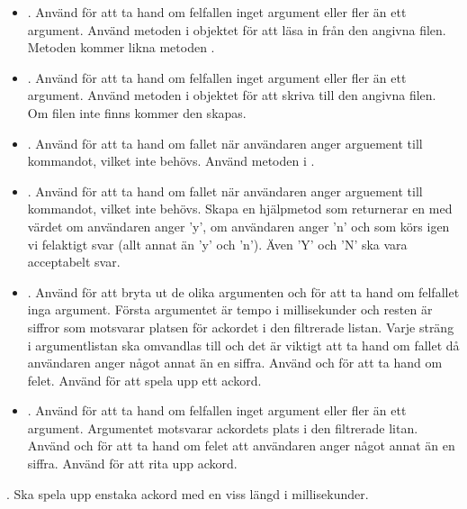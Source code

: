 {\begin{itemize}
\item {}. Använd  för att ta hand om felfallen inget argument eller fler än ett argument. Använd metoden  i objektet  för att läsa in från den angivna filen. Metoden kommer likna metoden .

\item {}. Använd  för att ta hand om felfallen inget argument eller fler än ett argument. Använd metoden  i objektet  för att skriva till den angivna filen. Om filen inte finns kommer den skapas.

\item {}. Använd  för att ta hand om fallet när användaren anger arguement till kommandot, vilket inte behövs. Använd metoden i .

\item {}. Använd  för att ta hand om fallet när användaren anger arguement till kommandot, vilket inte behövs. Skapa en hjälpmetod  som returnerar en  med värdet  om användaren anger 'y',  om användaren anger 'n' och som körs igen vi felaktigt svar (allt annat än 'y' och 'n'). Även 'Y' och 'N' ska vara acceptabelt svar.

\item {}. Använd  för att bryta ut de olika argumenten och för att ta hand om felfallet inga argument. Första argumentet är tempo i millisekunder och resten är siffror som motsvarar platsen för ackordet i den filtrerade listan. Varje sträng i argumentlistan ska omvandlas till  och det är viktigt att ta hand om fallet då användaren anger något annat än en siffra. Använd  och  för att ta hand om felet. Använd  för att spela upp ett ackord.

\item {}. Använd  för att ta hand om felfallen inget argument eller fler än ett argument. Argumentet motsvarar ackordets plats i den filtrerade litan. Använd  och  för att ta hand om felet att användaren anger något annat än en siffra. Använd  för att rita upp ackord.
\end{itemize}

\Task {}. Ska spela upp enstaka ackord  med en viss längd  i millisekunder.

}
